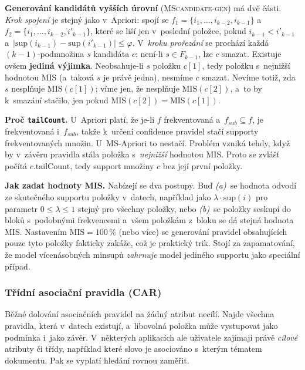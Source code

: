 \documentclass[11pt,a4paper]{article}
\theoremstyle{definition}
\begin{document}
\textbf{Generování kandidátů vyšších úrovní} (\textsc{MScandidate-gen}) má dvě části.
\emph{Krok spojení} je stejný jako v~Apriori: spojí se $f_1=\{i_1,\dots,i_{k-2},i_{k-1}\}$
a~$f_2=\{i_1,\dots,i_{k-2},i'_{k-1}\}$, které se liší jen v~poslední položce, pokud
$i_{k-1}<i'_{k-1}$ a~$|\mathrm{sup}(i_{k-1})-\mathrm{sup}(i'_{k-1})|\le\varphi$.
V~\emph{kroku prořezání} se prochází každá $(k-1)$-podmnožina $s$ kandidáta $c$: není-li
$s\in F_{k-1}$, lze $c$ smazat. Existuje ovšem \textbf{jediná výjimka}. Neobsahuje-li $s$
položku $c[1]$, tedy položku s~nejnižší hodnotou MIS (a~taková $s$ je právě jedna), nesmíme
$c$ smazat. Nevíme totiž, zda $s$ nesplňuje
$\mathrm{MIS}(c[1])$; víme jen, že nesplňuje $\mathrm{MIS}(c[2])$, a~to by k~smazání stačilo,
jen pokud $\mathrm{MIS}(c[2])=\mathrm{MIS}(c[1])$.

\textbf{Proč \texttt{tailCount}.} U~Apriori platí, že je-li $f$ frekventovaná
a~$f_{sub}\subseteq f$, je frekventovaná i~$f_{sub}$, takže k~určení confidence pravidel
stačí supporty frekventovaných množin. U~MS-Apriori to nestačí. Problém vzniká tehdy, když by
v~závěru pravidla stála položka s~\emph{nejnižší} hodnotou MIS. Proto se zvlášť počítá
$c.\mathrm{tailCount}$, tedy support množiny $c$ bez její první položky.

\textbf{Jak zadat hodnoty MIS.} Nabízejí se dva postupy. Buď \emph{(a)}~se hodnota odvodí ze
skutečného supportu položky v~datech, například jako $\lambda\cdot\mathrm{sup}(i)$ pro
parametr $0\le\lambda\le 1$ stejný pro všechny položky, nebo \emph{(b)}~se položky seskupí do
bloků s~podobnými frekvencemi a~všem položkám z~bloku se dá stejná hodnota MIS. Nastavením
$\mathrm{MIS}=100\,\%$ (nebo více) se generování pravidel obsahujících pouze tyto položky
fakticky zakáže, což je praktický trik. Stojí za zapamatování, že model vícenásobných
minsupů \emph{zahrnuje} model jediného supportu jako speciální případ.

\subsubsection{Třídní asociační pravidla (CAR)}

Běžné dolování asociačních pravidel na žádný atribut necílí. Najde všechna pravidla, která
v~datech existují, a~libovolná položka může vystupovat jako podmínka i~jako závěr. V~některých
aplikacích ale uživatele zajímají právě \emph{cílové} atributy či třídy, například které
slovo je asociováno s~kterým tématem dokumentu. Pak se vyplatí hledání rovnou zaměřit.
\end{document}
